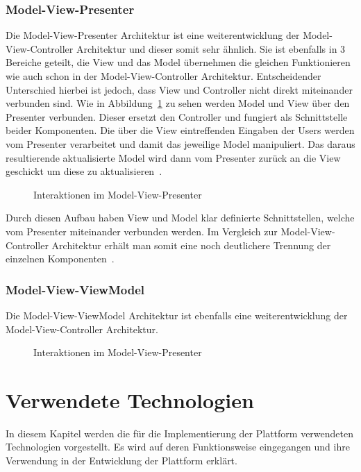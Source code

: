     \subsection{Model-View-Presenter}\label{subsec:model-view-presenter}
    Die Model-View-Presenter Architektur ist eine weiterentwicklung der Model-View-Controller Architektur und dieser somit sehr ähnlich.
    Sie ist ebenfalls in 3 Bereiche geteilt, die View und das Model übernehmen die gleichen Funktionieren wie auch schon in der Model-View-Controller Architektur.
    Entscheidender Unterschied hierbei ist jedoch, dass View und Controller nicht direkt miteinander verbunden sind.
    Wie in Abbildung~\ref{fig:mvp} zu sehen werden Model und View über den Presenter verbunden.
    Dieser ersetzt den Controller und fungiert als Schnittstelle beider Komponenten.
    Die über die View eintreffenden Eingaben der Users werden vom Presenter verarbeitet und damit das jeweilige Model manipuliert.
    Das daraus resultierende aktualisierte Model wird dann vom Presenter zurück an die View geschickt um diese zu aktualisieren~\cite{mvp1}.
    \begin{figure}[h]
        \centering
        
        \caption{Interaktionen im Model-View-Presenter}
        \label{fig:mvp}
    \end{figure}

    Durch diesen Aufbau haben View und Model klar definierte Schnittstellen, welche vom Presenter miteinander verbunden werden.
    Im Vergleich zur Model-View-Controller Architektur erhält man somit eine noch deutlichere Trennung der einzelnen Komponenten~\cite{mvp2}.

    \subsection{Model-View-ViewModel}\label{subsec:model-view-viewmodel}
    Die Model-View-ViewModel Architektur ist ebenfalls eine weiterentwicklung der Model-View-Controller Architektur.


    \begin{figure}[h]
        \centering
        
        \caption{Interaktionen im Model-View-Presenter}
        \label{fig:mvvm}
    \end{figure}

    \cite{Anderson2012}

    \chapter{Verwendete Technologien}\label{ch:verwendete-technologien}
    In diesem Kapitel werden die für die Implementierung der Plattform verwendeten Technologien vorgestellt.
    Es wird auf deren Funktionsweise eingegangen und ihre Verwendung in der Entwicklung der Plattform erklärt.


